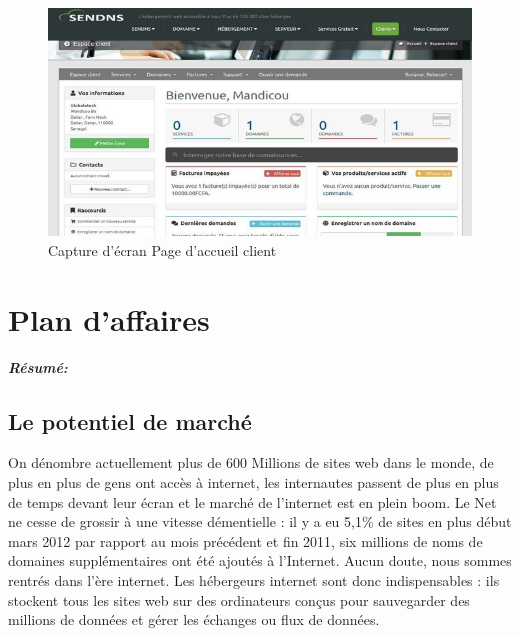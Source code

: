 \documentclass[a4paper, 12pt]{report}
\begin{document}
\begin{figure}[H]
	\centering
	\includegraphics{img/solution/12}
	\caption{Capture d'écran Page d’accueil client}
	\label{Tux}
\end{figure}
\chapter{Plan d'affaires}
\textit{\textbf{Résumé:}}
\setcounter{minitocdepth}{2}
\minitoc
\section{Le potentiel de marché}
\noindent On dénombre actuellement plus de 600 Millions de sites web dans le monde, de plus en plus de gens ont accès à internet, les internautes passent de plus en plus de temps devant leur écran et le marché de l'internet est en plein boom. Le Net ne cesse de grossir à une vitesse démentielle : il y a eu 5,1\% de sites en plus début mars 2012 par rapport au mois précédent et fin 2011, six millions de noms de domaines supplémentaires ont été ajoutés à l'Internet.
Aucun doute, nous sommes rentrés dans l’ère internet. Les hébergeurs internet sont donc indispensables : ils stockent tous les sites web sur des ordinateurs conçus pour sauvegarder des millions de données et gérer les échanges ou flux de données.
\end{document}
